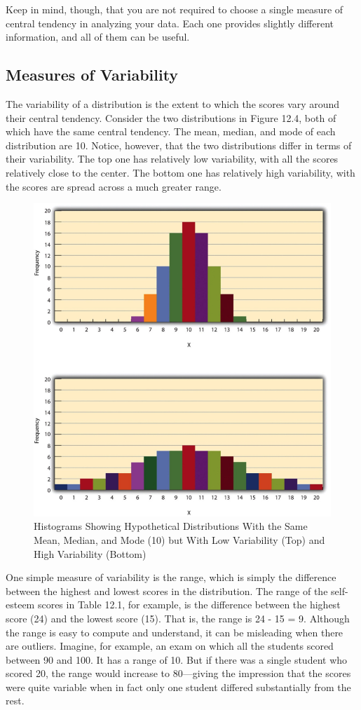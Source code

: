 Keep in mind, though, that you are not required to choose a single measure of central tendency in analyzing your data. Each one provides slightly different information, and all of them can be useful.



\subsection{Measures of Variability}

The variability of a distribution is the extent to which the scores vary around their central tendency. Consider the two distributions in Figure 12.4, both of which have the same central tendency. The mean, median, and mode of each distribution are 10. Notice, however, that the two distributions differ in terms of their variability. The top one has relatively low variability, with all the scores relatively close to the center. The bottom one has relatively high variability, with the scores are spread across a much greater range.


\begin{figure}

\includegraphics[width=.7\linewidth]{figures/Fig124}
\caption{Histograms Showing Hypothetical Distributions With the Same Mean, Median, and Mode (10) but With Low Variability (Top) and High Variability (Bottom)}

\label{fig:variability}

\end{figure}

One simple measure of variability is the range, which is simply the difference between the highest and lowest
scores in the distribution. The range of the self-esteem scores in Table 12.1, for example, is the difference between the highest score (24) and the lowest score (15). That is, the range is 24 - 15 = 9. Although the range is easy to compute and understand, it can be misleading when there are outliers. Imagine, for example, an exam on which all the students scored between 90 and 100. It has a range of 10. But if there was a single student who scored 20, the range would increase to 80---giving the impression that the scores were quite variable when in fact only one student differed substantially from the rest.

